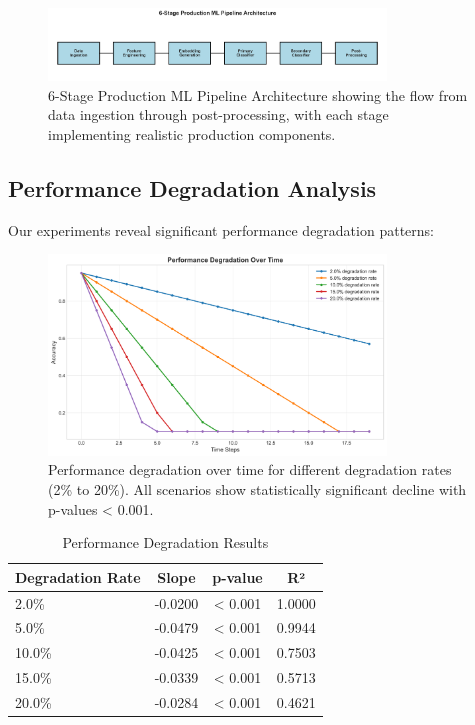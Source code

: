 \documentclass{article}
\begin{document}
\begin{figure}[h]
\centering
\includegraphics[width=0.8\textwidth]{media/pipeline_architecture.png}
\caption{6-Stage Production ML Pipeline Architecture showing the flow from data ingestion through post-processing, with each stage implementing realistic production components.}
\label{fig:pipeline_architecture}
\end{figure}

\subsection{Performance Degradation Analysis}

Our experiments reveal significant performance degradation patterns:

\begin{figure}[h]
\centering
\includegraphics[width=0.8\textwidth]{media/degradation_plot.png}
\caption{Performance degradation over time for different degradation rates (2\% to 20\%). All scenarios show statistically significant decline with p-values < 0.001.}
\label{fig:degradation}
\end{figure}

\begin{table}[h]
\centering
\caption{Performance Degradation Results}
\begin{tabular}{lccc}
\toprule
\textbf{Degradation Rate} & \textbf{Slope} & \textbf{p-value} & \textbf{R²} \\
\midrule
2.0\% & -0.0200 & < 0.001 & 1.0000 \\
5.0\% & -0.0479 & < 0.001 & 0.9944 \\
10.0\% & -0.0425 & < 0.001 & 0.7503 \\
15.0\% & -0.0339 & < 0.001 & 0.5713 \\
20.0\% & -0.0284 & < 0.001 & 0.4621 \\
\bottomrule
\end{tabular}
\end{table}
\end{document}
